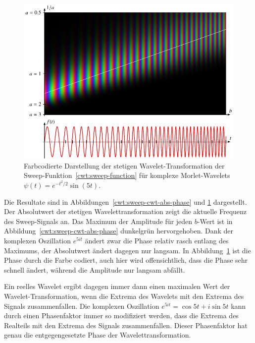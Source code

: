 \begin{beispiel}
\begin{figure}
\end{figure}
\begin{figure}
\centering
\includegraphics[width=\hsize]{chapters/4-cwt/images/sweep.pdf}
\caption{Farbcodierte Darstellung der stetigen Wavelet-Transformation
der Sweep-Funktion~\eqref{cwt:sweep-function}
für komplexe Morlet-Wavelets $\psi(t) = e^{-t^2/2} \sin(5t)$.
\label{cwt:sweep-cwt-color}}
\end{figure}
Die Resultate sind in Abbildungen~\ref{cwt:sweep-cwt-abs-phase} und
\ref{cwt:sweep-cwt-color} dargestellt.
Der Absolutwert der stetigen Wavelettransformation zeigt die aktuelle
Frequenz des Sweep-Signals an.
Das Maximum der Amplitude für jeden $b$-Wert ist in
Abbildung~\ref{cwt:sweep-cwt-abs-phase} dunkelgrün hervorgehoben.
Dank der komplexen Oszillation $e^{5it}$ ändert zwar die Phase relativ
rasch entlang des Maximums, der Absolutwert ändert dagegen nur 
langsam.
In Abbildung~\ref{cwt:sweep-cwt-color} ist die Phase durch die Farbe
codiert, auch hier wird offensichtlich, dass die Phase sehr schnell ändert,
während die Amplitude nur langsam abfällt.

Ein reelles Wavelet ergibt dagegen immer dann einen maximalen Wert der
Wavelet-Trans\-for\-ma\-tion, wenn die Extrema des Wavelets mit den Extrema
des Signals zusammenfallen.
Die komplexen Oszillation $e^{5it}=\cos 5t + i\sin 5t$ kann durch einen
Phasenfaktor immer so modifiziert werden, dass die Extrema des Realteils
mit den Extrema des Signals zusammenfallen.
Dieser Phasenfaktor hat genau die entgegengesetzte Phase der
Wavelettransformation.
\end{beispiel}
